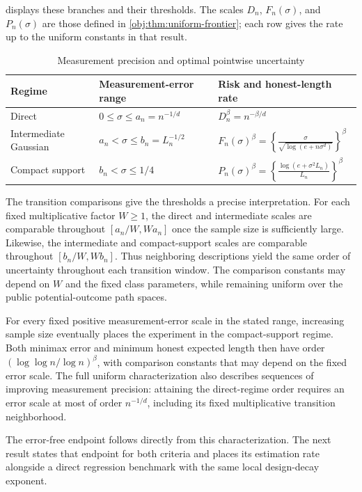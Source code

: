 \documentclass[11pt]{article}
\begin{document}
 displays these branches and their thresholds. The scales \(D_n\), \(F_n(\sigma)\), and \(P_n(\sigma)\) are those defined in \cref{obj:thm:uniform-frontier}; each row gives the rate up to the uniform constants in that result.

\begin{table}[htbp]
\centering
\caption{Measurement precision and optimal pointwise uncertainty}
\label{tab:precision-regimes}
\begin{tabular}{lll}
\hline
Regime & Measurement-error range & Risk and honest-length rate \\
\hline
Direct
& \(0\le \sigma\le a_n=n^{-1/d}\)
& \(D_n^\beta=n^{-\beta/d}\) \\[4pt]
Intermediate Gaussian
& \(a_n<\sigma\le b_n=L_n^{-1/2}\)
& \(\displaystyle F_n(\sigma)^\beta
=\left\{\frac{\sigma}{\sqrt{\log(e+n\sigma^d)}}\right\}^{\beta}\) \\[8pt]
Compact support
& \(b_n<\sigma\le1/4\)
& \(\displaystyle P_n(\sigma)^\beta
=\left\{\frac{\log(e+\sigma^2L_n)}{L_n}\right\}^{\beta}\) \\[6pt]
\hline
\end{tabular}
\end{table}

The transition comparisons give the thresholds a precise interpretation. For each fixed multiplicative factor \(W\ge1\), the direct and intermediate scales are comparable throughout \([a_n/W,Wa_n]\) once the sample size is sufficiently large. Likewise, the intermediate and compact-support scales are comparable throughout \([b_n/W,Wb_n]\). Thus neighboring descriptions yield the same order of uncertainty throughout each transition window. The comparison constants may depend on \(W\) and the fixed class parameters, while remaining uniform over the public potential-outcome path spaces.

For every fixed positive measurement-error scale in the stated range, increasing sample size eventually places the experiment in the compact-support regime. Both minimax error and minimum honest expected length then have order \((\log\log n/\log n)^\beta\), with comparison constants that may depend on the fixed error scale. The full uniform characterization also describes sequences of improving measurement precision: attaining the direct-regime order requires an error scale at most of order \(n^{-1/d}\), including its fixed multiplicative transition neighborhood.

The error-free endpoint follows directly from this characterization. The next result states that endpoint for both criteria and places its estimation rate alongside a direct regression benchmark with the same local design-decay exponent.
\end{document}
